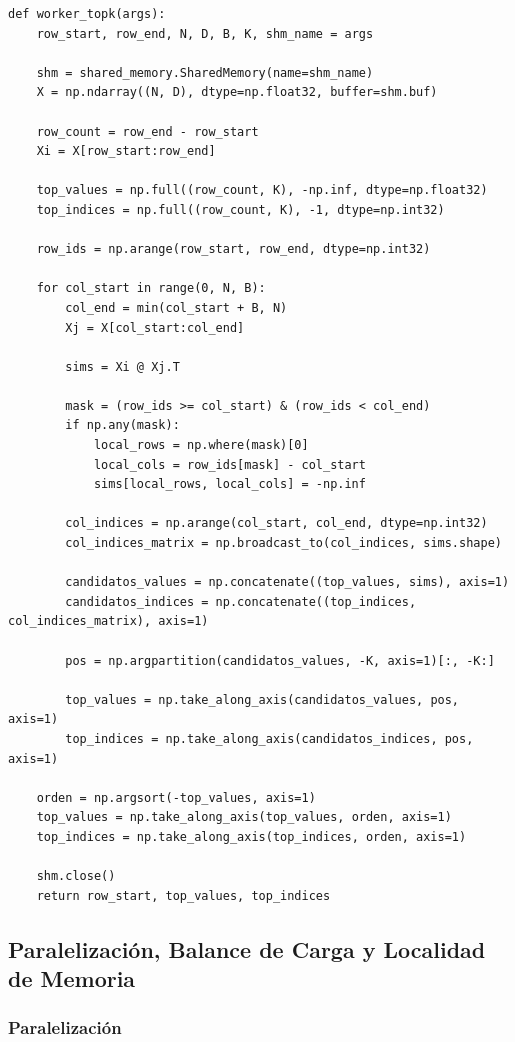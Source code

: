 \documentclass[10pt,a4paper]{article}
\begin{document}
\begin{lstlisting}[caption={Worker que procesa un rango de filas y actualiza top-$k$.}]
def worker_topk(args):
    row_start, row_end, N, D, B, K, shm_name = args

    shm = shared_memory.SharedMemory(name=shm_name)
    X = np.ndarray((N, D), dtype=np.float32, buffer=shm.buf)

    row_count = row_end - row_start
    Xi = X[row_start:row_end]

    top_values = np.full((row_count, K), -np.inf, dtype=np.float32)
    top_indices = np.full((row_count, K), -1, dtype=np.int32)

    row_ids = np.arange(row_start, row_end, dtype=np.int32)

    for col_start in range(0, N, B):
        col_end = min(col_start + B, N)
        Xj = X[col_start:col_end]

        sims = Xi @ Xj.T

        mask = (row_ids >= col_start) & (row_ids < col_end)
        if np.any(mask):
            local_rows = np.where(mask)[0]
            local_cols = row_ids[mask] - col_start
            sims[local_rows, local_cols] = -np.inf

        col_indices = np.arange(col_start, col_end, dtype=np.int32)
        col_indices_matrix = np.broadcast_to(col_indices, sims.shape)

        candidatos_values = np.concatenate((top_values, sims), axis=1)
        candidatos_indices = np.concatenate((top_indices, col_indices_matrix), axis=1)

        pos = np.argpartition(candidatos_values, -K, axis=1)[:, -K:]

        top_values = np.take_along_axis(candidatos_values, pos, axis=1)
        top_indices = np.take_along_axis(candidatos_indices, pos, axis=1)

    orden = np.argsort(-top_values, axis=1)
    top_values = np.take_along_axis(top_values, orden, axis=1)
    top_indices = np.take_along_axis(top_indices, orden, axis=1)

    shm.close()
    return row_start, top_values, top_indices
\end{lstlisting}

\subsection{Paralelizaci\'on, Balance de Carga y Localidad de Memoria}

\subsubsection{Paralelizaci\'on}
\end{document}
